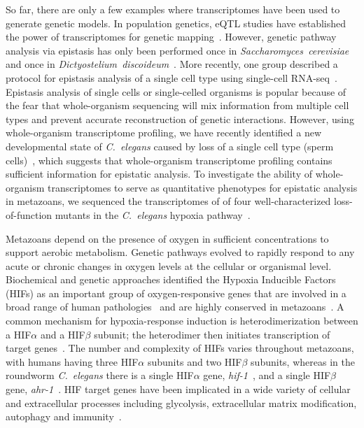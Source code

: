 \documentclass[9pt,twocolumn,twoside,lineno]{pnas-new}
\newcommand{\cel}{\emph{C.~elegans}}
\newcommand{\gene}[1]{\emph{#1}}
\begin{document}
So far, there are only a few examples where transcriptomes have been used to
generate genetic models. In population genetics, eQTL studies have established
the power of transcriptomes for genetic
mapping~\cite{Brem2002,Schadt2003,Li2006,King2014}. However, genetic pathway
analysis via epistasis has only been performed once in
\emph{Saccharomyces~cerevisiae}~\cite{Hughes2000} and once in
\emph{Dictyostelium~discoideum}~\cite{VanDriessche2005}. More recently, one
group described a protocol for epistasis analysis of a single cell type using
single-cell RNA-seq~\cite{Dixit2016}. Epistasis analysis of single cells or
single-celled organisms is popular because of the fear that whole-organism
sequencing will mix information from multiple cell types and prevent accurate
reconstruction of genetic interactions. However, using whole-organism
transcriptome profiling, we have recently identified a new developmental state
of \cel{} caused by loss of a single cell type (sperm
cells)~\cite{Angeles-Albores2016a}, which suggests that whole-organism
transcriptome profiling contains sufficient information for epistatic analysis.
To investigate the ability of whole-organism transcriptomes to serve as
quantitative phenotypes for epistatic analysis in metazoans, we sequenced the
transcriptomes of of four well-characterized loss-of-function mutants in the
\cel{} hypoxia pathway~\cite{Epstein2001,Shen2006,Shao2009,Jiang2001}.

Metazoans depend on the presence of oxygen in sufficient concentrations to
support aerobic metabolism. Genetic pathways evolved to rapidly respond to any
acute or chronic changes in oxygen levels at the cellular or organismal level.
Biochemical and genetic approaches identified the Hypoxia Inducible Factors
(HIFs) as an important group of oxygen-responsive genes that are involved in a
broad range of human pathologies~\cite{Semenza2012} and are highly conserved in
metazoans~\cite{Loenarz2011}. A common mechanism for hypoxia-response induction
is heterodimerization between a HIF$\alpha$ and a HIF$\beta$ subunit; the
heterodimer then initiates transcription of target genes~\cite{Jiang1996}. The
number and complexity of HIFs varies throughout metazoans, with humans having
three HIF$\alpha$ subunits and two HIF$\beta$ subunits, whereas in the roundworm
\cel{} there is a single HIF$\alpha$ gene, \gene{hif-1}~\cite{Jiang2001}, and a
single HIF$\beta$ gene, \gene{ahr-1}~\cite{Powell-Coffman1998}. HIF target genes
have been implicated in a wide variety of cellular and extracellular processes
including glycolysis, extracellular matrix modification, autophagy and
immunity~\cite{Semenza1994,Bishop2004,Shen2005,Bellier2009,Semenza2012}.
\end{document}

